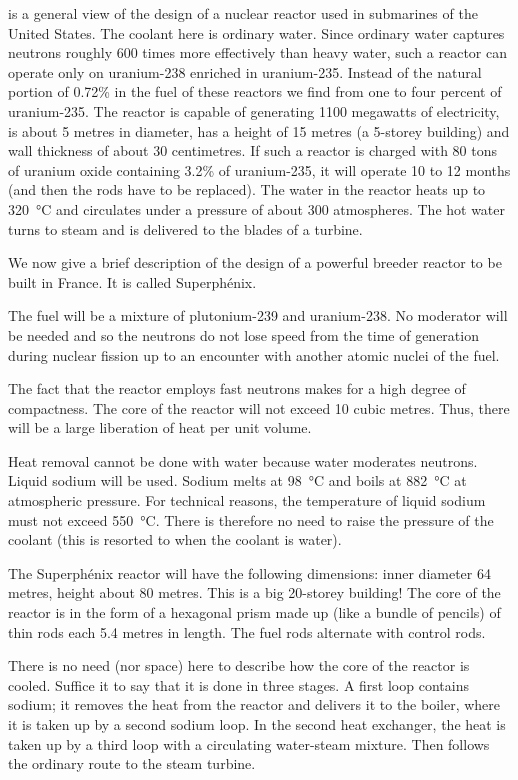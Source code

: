  is a general view of the design of a nuclear reactor used in submarines of the United States. The coolant here is ordinary water. Since ordinary water captures neutrons roughly 600 times more effectively than heavy water, such a reactor can operate only on uranium-238 enriched in uranium-235. Instead of the natural portion of 0.72\% in the fuel of these reactors we find from one to four percent of uranium-235. The reactor is capable of generating 1100 megawatts of electricity, is about 5 metres in diameter, has a height of 15 metres (a 5-sto­rey building) and wall thickness of about 30 centimetres. If such a reactor is charged with 80 tons of uranium oxide containing 3.2\% of uranium-235, it will operate 10 to 12 months (and then the rods have to be replaced). The water in the reactor heats up to \SI{320}{\celsius} and circulates under a pressure of about 300 atmospheres. The hot water turns to steam and is delivered to the blades of a tur­bine.

We now give a brief description of the design of a powerful breeder reactor to be built in France. It is called Superph\'enix.

The fuel will be a mixture of plutonium-239 and ura­nium-238. No moderator will be needed and so the neu­trons do not lose speed from the time of generation during nuclear fission up to an encounter with another atomic nuclei of the fuel.

The fact that the reactor employs fast neutrons makes for a high degree of compactness. The core of the reactor will not exceed 10 cubic metres. Thus, there will be a large liberation of heat per unit volume.

Heat removal cannot be done with water because water moderates neutrons. Liquid sodium will be used. Sodium melts at \SI{98}{\celsius} and boils at \SI{882}{\celsius} at atmospheric pressure. For technical reasons, the temperature of liquid sodium must not exceed \SI{550}{\celsius}. There is therefore no need to raise the pressure of the coolant (this is resorted to when the coolant is water).

The Superph\'enix reactor will have the following dimen­sions: inner diameter 64 metres, height about 80 metres. This is a big 20-storey building! The core of the reactor is in the form of a hexagonal prism made up (like a bundle of pencils) of thin rods each 5.4 metres in length. The fuel rods alternate with control rods.

There is no need (nor space) here to describe how the core of the reactor is cooled. Suffice it to say that it is done in three stages. A first loop contains sodium; it removes the heat from the reactor and delivers it to the boiler, where it is taken up by a second sodium loop. In the second heat exchanger, the heat is taken up by a third loop with a circulating water-steam mixture. Then follows the ordinary route to the steam turbine.

